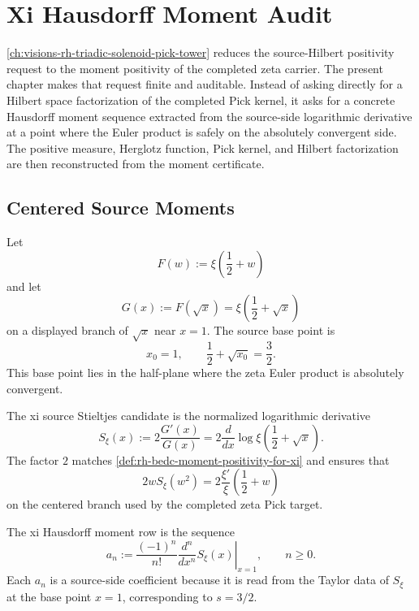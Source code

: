 \chapter{Xi Hausdorff Moment Audit}
\label{ch:visions-rh-xi-hausdorff-moment-audit}

\autoref{ch:visions-rh-triadic-solenoid-pick-tower} reduces the
source-Hilbert positivity request to the moment positivity of the
completed zeta carrier. The present chapter makes that request finite
and auditable. Instead of asking directly for a Hilbert space
factorization of the completed Pick kernel, it asks for a concrete
Hausdorff moment sequence extracted from the source-side logarithmic
derivative at a point where the Euler product is safely on the
absolutely convergent side. The positive measure, Herglotz function, Pick
kernel, and Hilbert factorization are then reconstructed from the moment
certificate.

\section{Centered Source Moments}
\label{sec:rh-xi-hausdorff-centered-source-moments}

\begin{definition}
\label{def:rh-centered-completed-zeta-carrier}
Let
$$
F(w)
:=
\xi\left(\frac12+w\right)
$$
and let
$$
G(x)
:=
F(\sqrt{x})
=
\xi\left(\frac12+\sqrt{x}\right)
$$
on a displayed branch of $\sqrt{x}$ near $x=1$. The source base point is
$$
x_0=1,
\qquad
\frac12+\sqrt{x_0}=\frac32.
$$
This base point lies in the half-plane where the zeta Euler product is
absolutely convergent.
\end{definition}

\begin{definition}
\label{def:rh-xi-source-stieltjes-candidate}
The xi source Stieltjes candidate is the normalized logarithmic
derivative
$$
S_{\xi}(x)
:=
2\frac{G'(x)}{G(x)}
=
2\frac{d}{dx}
\log\xi\left(\frac12+\sqrt{x}\right).
$$
The factor $2$ matches
\autoref{def:rh-bedc-moment-positivity-for-xi} and ensures that
$$
2wS_{\xi}(w^2)
=
2\frac{\xi'}{\xi}\left(\frac12+w\right)
$$
on the centered branch used by the completed zeta Pick target.
\end{definition}

\begin{definition}
\label{def:rh-xi-hausdorff-moment-row}
The xi Hausdorff moment row is the sequence
$$
a_n
:=
\frac{(-1)^n}{n!}
\left.
\frac{d^n}{dx^n}S_{\xi}(x)
\right|_{x=1},
\qquad
n\ge0.
$$
Each $a_n$ is a source-side coefficient because it is read from the
Taylor data of $S_{\xi}$ at the base point $x=1$, corresponding to
$s=3/2$.
\end{definition}

